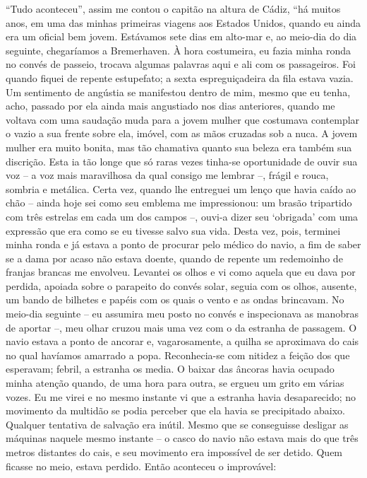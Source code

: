 ``Tudo aconteceu'', assim me contou o capitão na altura de Cádiz, ``há
muitos anos, em uma das minhas primeiras viagens aos Estados Unidos,
quando eu ainda era um oficial bem jovem. Estávamos sete dias em
alto-mar e, ao meio-dia do dia seguinte, chegaríamos a Bremerhaven. À
hora costumeira, eu fazia minha ronda no convés de passeio, trocava
algumas palavras aqui e ali com os passageiros. Foi quando fiquei de
repente estupefato; a sexta espreguiçadeira da fila estava vazia. Um
sentimento de angústia se manifestou dentro de mim, mesmo que eu tenha,
acho, passado por ela ainda mais angustiado nos dias anteriores, quando
me voltava com uma saudação muda para a jovem mulher que costumava
contemplar o vazio a sua frente sobre ela, imóvel, com as mãos cruzadas
sob a nuca. A jovem mulher era muito bonita, mas tão chamativa quanto
sua beleza era também sua discrição. Esta ia tão longe que só raras
vezes tinha-se oportunidade de ouvir sua voz -- a voz mais maravilhosa
da qual consigo me lembrar --, frágil e rouca, sombria e metálica. Certa
vez, quando lhe entreguei um lenço que havia caído ao chão -- ainda hoje
sei como seu emblema me impressionou: um brasão tripartido com três
estrelas em cada um dos campos --, ouvi-a dizer seu `obrigada' com uma
expressão que era como se eu tivesse salvo sua vida. Desta vez, pois,
terminei minha ronda e já estava a ponto de procurar pelo médico do
navio, a fim de saber se a dama por acaso não estava doente, quando de
repente um redemoinho de franjas brancas me envolveu. Levantei os olhos
e vi como aquela que eu dava por perdida, apoiada sobre o parapeito do
convés solar, seguia com os olhos, ausente, um bando de bilhetes e
papéis com os quais o vento e as ondas brincavam. No meio-dia seguinte
-- eu assumira meu posto no convés e inspecionava as manobras de aportar
--, meu olhar cruzou mais uma vez com o da estranha de passagem. O navio
estava a ponto de ancorar e, vagarosamente, a quilha se aproximava do
cais no qual havíamos amarrado a popa. Reconhecia-se com nitidez a
feição dos que esperavam; febril, a estranha os media. O baixar das
âncoras havia ocupado minha atenção quando, de uma hora para outra, se
ergueu um grito em várias vozes. Eu me virei e no mesmo instante vi que
a estranha havia desaparecido; no movimento da multidão se podia
perceber que ela havia se precipitado abaixo. Qualquer tentativa de
salvação era inútil. Mesmo que se conseguisse desligar as máquinas
naquele mesmo instante -- o casco do navio não estava mais do que três
metros distantes do cais, e seu movimento era impossível de ser detido.
Quem ficasse no meio, estava perdido. Então aconteceu o improvável:
